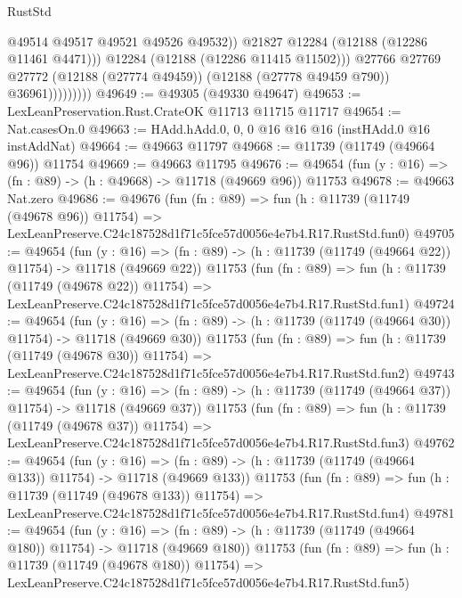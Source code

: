 \begin{lexlean}{RustStd}
\begin{coremodule}
                              @49514
                              @49517
                              @49521
                              @49526
                              @49532))
                          @21827
                          @12284
                          (@12188 (@12286 @11461 @4471)))
                        @12284
                        (@12188 (@12286 @11415 @11502)))
                      @27766
                      @27769
                      @27772
                      (@12188 (@27774 @49459))
                      (@12188 (@27778 @49459 @790))
                      @36961)))))))))
@49649 := @49305 (@49330 @49647)
@49653 := LexLeanPreservation.Rust.CrateOK @11713 @11715 @11717
@49654 := Nat.casesOn.{0}
@49663 := HAdd.hAdd.{0, 0, 0} @16 @16 @16 (instHAdd.{0} @16 instAddNat)
@49664 := @49663 @11797
@49668 := @11739 (@11749 (@49664 @96)) @11754
@49669 := @49663 @11795
@49676 := @49654 (fun (y : @16) => (fn : @89) -> (h : @49668) -> @11718 (@49669 @96)) @11753
@49678 := @49663 Nat.zero
@49686 := @49676
    (fun (fn : @89) =>
    fun (h : @11739 (@11749 (@49678 @96)) @11754) =>
    LexLeanPreserve.C24c187528d1f71c5fce57d0056e4e7b4.R17.RustStd.fun0)
@49705 := @49654
    (fun (y : @16) =>
    (fn : @89) -> (h : @11739 (@11749 (@49664 @22)) @11754) -> @11718 (@49669 @22))
    @11753
    (fun (fn : @89) =>
    fun (h : @11739 (@11749 (@49678 @22)) @11754) =>
    LexLeanPreserve.C24c187528d1f71c5fce57d0056e4e7b4.R17.RustStd.fun1)
@49724 := @49654
    (fun (y : @16) =>
    (fn : @89) -> (h : @11739 (@11749 (@49664 @30)) @11754) -> @11718 (@49669 @30))
    @11753
    (fun (fn : @89) =>
    fun (h : @11739 (@11749 (@49678 @30)) @11754) =>
    LexLeanPreserve.C24c187528d1f71c5fce57d0056e4e7b4.R17.RustStd.fun2)
@49743 := @49654
    (fun (y : @16) =>
    (fn : @89) -> (h : @11739 (@11749 (@49664 @37)) @11754) -> @11718 (@49669 @37))
    @11753
    (fun (fn : @89) =>
    fun (h : @11739 (@11749 (@49678 @37)) @11754) =>
    LexLeanPreserve.C24c187528d1f71c5fce57d0056e4e7b4.R17.RustStd.fun3)
@49762 := @49654
    (fun (y : @16) =>
    (fn : @89) -> (h : @11739 (@11749 (@49664 @133)) @11754) -> @11718 (@49669 @133))
    @11753
    (fun (fn : @89) =>
    fun (h : @11739 (@11749 (@49678 @133)) @11754) =>
    LexLeanPreserve.C24c187528d1f71c5fce57d0056e4e7b4.R17.RustStd.fun4)
@49781 := @49654
    (fun (y : @16) =>
    (fn : @89) -> (h : @11739 (@11749 (@49664 @180)) @11754) -> @11718 (@49669 @180))
    @11753
    (fun (fn : @89) =>
    fun (h : @11739 (@11749 (@49678 @180)) @11754) =>
    LexLeanPreserve.C24c187528d1f71c5fce57d0056e4e7b4.R17.RustStd.fun5)

\end{coremodule}
\end{lexlean}
